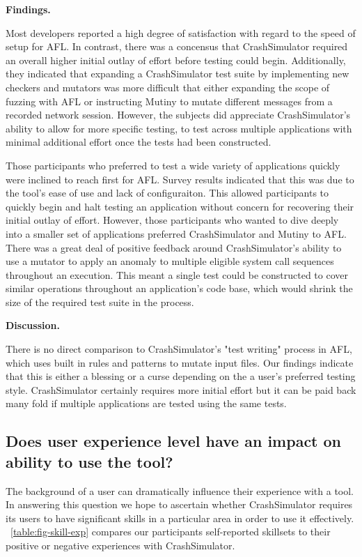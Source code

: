 {\bf Findings. }


Most developers reported a high degree of
satisfaction with regard to the speed
of setup for AFL.  In contrast, there was a concensus that
CrashSimulator required an
overall higher initial outlay of effort before testing could begin.
Additionally, they indicated that expanding a CrashSimulator test suite by
implementing new checkers and mutators was more difficult that either
expanding the scope of fuzzing with AFL or instructing Mutiny to mutate
different messages from a recorded network session.  However, the subjects
did appreciate
CrashSimulator's ability to allow for
more specific testing,
to test across multiple applications
with minimal additional effort once the tests had been constructed.

Those participants who preferred to test a wide variety of applications
quickly were inclined to reach first for AFL.  Survey results indicated
that this was due to the tool's ease of use and lack of configuraiton.
This allowed participants to quickly begin and halt testing an application
without concern for recovering their initial outlay of effort.  However,
those participants
who wanted to dive deeply into a smaller set of applications
preferred CrashSimulator and Mutiny to AFL.  There was a great deal of
positive feedback around CrashSimulator's ability to use a mutator to apply
an anomaly to multiple eligible system call sequences throughout an
execution.  This meant a single test could be constructed to cover similar
operations throughout an application's code base, which would
shrink the size of the
required test suite in the process.


{\bf Discussion. }

There is no direct comparison to CrashSimulator's "test writing"
process in AFL, which
uses built in rules and patterns to mutate input files.  Our
findings indicate that this is either a blessing or a curse
depending on the
a user's preferred testing style.  CrashSimulator certainly requires
more initial effort but it can be paid back many fold if multiple
applications are tested using the same tests.


\subsection{Does user experience level have an impact on ability to use the
tool?}

The background of a user can
dramatically influence their experience with a
tool.  In answering this question we hope to ascertain whether
CrashSimulator requires its users to
have significant skills in a particular
area in order to use it effectively. ~\ref{table:fig-skill-exp}
compares our participants
self-reported skillsets to their positive or negative experiences with
CrashSimulator.


